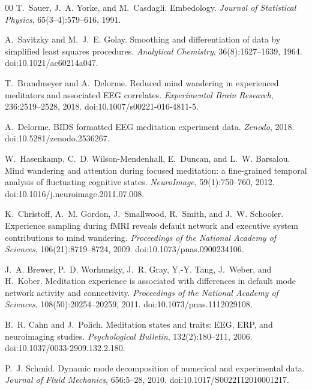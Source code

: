 \documentclass[5p,twocolumn,authoryear]{elsarticle}
\begin{document}
\begin{thebibliography}{00}
T.~Sauer, J.~A. Yorke, and M.~Casdagli.
\newblock Embedology.
\newblock \emph{Journal of Statistical Physics}, 65(3--4):579--616, 1991.

A.~Savitzky and M.~J.~E. Golay.
\newblock Smoothing and differentiation of data by simplified least squares procedures.
\newblock \emph{Analytical Chemistry}, 36(8):1627--1639, 1964.
\newblock doi:10.1021/ac60214a047.

T.~Brandmeyer and A.~Delorme.
\newblock Reduced mind wandering in experienced meditators and associated EEG correlates.
\newblock \emph{Experimental Brain Research}, 236:2519--2528, 2018.
\newblock doi:10.1007/s00221-016-4811-5.

A.~Delorme.
\newblock BIDS formatted EEG meditation experiment data.
\newblock \emph{Zenodo}, 2018.
\newblock doi:10.5281/zenodo.2536267.

W.~Hasenkamp, C.~D. Wilson-Mendenhall, E.~Duncan, and L.~W. Barsalou.
\newblock Mind wandering and attention during focused meditation: a fine-grained temporal analysis of fluctuating cognitive states.
\newblock \emph{NeuroImage}, 59(1):750--760, 2012.
\newblock doi:10.1016/j.neuroimage.2011.07.008.

K.~Christoff, A.~M. Gordon, J.~Smallwood, R.~Smith, and J.~W. Schooler.
\newblock Experience sampling during fMRI reveals default network and executive system contributions to mind wandering.
\newblock \emph{Proceedings of the National Academy of Sciences}, 106(21):8719--8724, 2009.
\newblock doi:10.1073/pnas.0900234106.

J.~A. Brewer, P.~D. Worhunsky, J.~R. Gray, Y.-Y. Tang, J.~Weber, and H.~Kober.
\newblock Meditation experience is associated with differences in default mode network activity and connectivity.
\newblock \emph{Proceedings of the National Academy of Sciences}, 108(50):20254--20259, 2011.
\newblock doi:10.1073/pnas.1112029108.

B.~R. Cahn and J.~Polich.
\newblock Meditation states and traits: EEG, ERP, and neuroimaging studies.
\newblock \emph{Psychological Bulletin}, 132(2):180--211, 2006.
\newblock doi:10.1037/0033-2909.132.2.180.

P.~J. Schmid.
\newblock Dynamic mode decomposition of numerical and experimental data.
\newblock \emph{Journal of Fluid Mechanics}, 656:5--28, 2010.
\newblock doi:10.1017/S0022112010001217.


\end{thebibliography}
\end{document}
